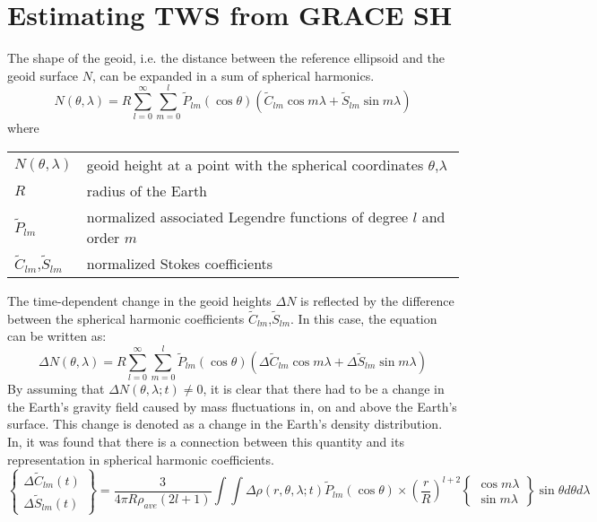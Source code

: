 \chapter{Estimating TWS from GRACE SH}\label{shmethod}
The shape of the geoid, i.e. the distance between the reference ellipsoid and the geoid surface $N$, can be expanded in a sum of spherical harmonics.
\begin{equation}
N(\theta, \lambda) = R \sum_{l=0}^{\infty} \sum_{m=0}^{l} \tilde{P}_{lm}(\cos \theta)(\tilde{C}_{lm} \cos m\lambda + \tilde{S}_{lm}\sin m\lambda)
\end{equation}
where
\begin{table}[htbp]
	\begin{tabular}{ll}	
		$N(\theta, \lambda)$	&  geoid height at a point with the spherical coordinates $\theta$,$\lambda$\\ 
		$R$	&  radius of the Earth\\ 
		$\tilde{P}_{lm}$	&  normalized associated Legendre functions of degree $l$ and order $m$\\ 
		$\tilde{C}_{lm}$,$\tilde{S}_{lm}$	&  normalized Stokes coefficients\\ 
	\end{tabular}
\end{table}
The time-dependent change in the geoid heights $\Delta N$ is reflected by the difference between the spherical harmonic coefficients $\tilde{C}_{lm}$,$\tilde{S}_{lm}$. In this case, the equation can be written as:
\begin{equation}
\Delta N(\theta, \lambda) = R \sum_{l=0}^{\infty} \sum_{m=0}^{l} \tilde{P}_{lm}(\cos \theta)(\Delta \tilde{C}_{lm} \cos m\lambda + \Delta \tilde{S}_{lm}\sin m\lambda)
\end{equation}
By assuming that $\Delta N(\theta, \lambda;t) \neq 0$, it is clear that there had to be a change in the Earth's gravity field caused by mass fluctuations in, on and above the Earth's surface. This change is denoted as a change in the Earth's density distribution. In\cite{wahr1998time}, it was found that there is a connection between this quantity and its representation in spherical harmonic coefficients.
\begin{equation}
\begin{Bmatrix}
\Delta \tilde{C}_{lm}(t)\\
\Delta \tilde{S}_{lm}(t)
\end{Bmatrix} = \frac{3}{4\pi R \rho_{ave}(2l+1)} \int \int \Delta \rho(r,\theta,\lambda;t) \tilde{P}_{lm}(\cos \theta) \times (\frac{r}{R})^{l+2} \begin{Bmatrix}
\cos m\lambda \\
\sin m\lambda
\end{Bmatrix} \sin\theta d\theta d\lambda
\end{equation}

